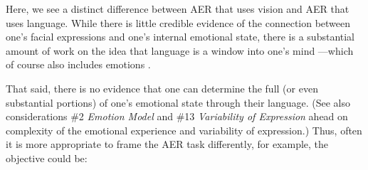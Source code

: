 \documentclass{clv3}
\begin{document}
Here, we see a distinct difference between AER that uses vision and AER that uses language. While there is little credible evidence of the connection between one’s facial expressions and one’s internal emotional state, there is a substantial amount of work on the idea that language is a window into one’s mind \cite{chomsky1975reflections,lakoff2008women,pinker2007stuff}---which of course also includes emotions \cite{bamberg1997language,wiebe2005annotating,tausczik2010psychological}.

That said, %
there is no evidence that
one can determine the full (or even substantial portions) of one's emotional state through their language. (See also considerations \#2 \textit{Emotion Model} and \#13 \textit{Variability of Expression} ahead on complexity of the emotional experience and variability of expression.)
Thus, often it is more appropriate to frame the AER task differently, for example, the objective could be:\\[-20pt]
\end{document}
